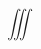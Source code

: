 \documentclass[12pt]{standalone}
\begin{document}
   \begin{varwidth}{50in}
        \begin{equation*}
            \iiint
        \end{equation*}
    \end{varwidth}
\end{document}
